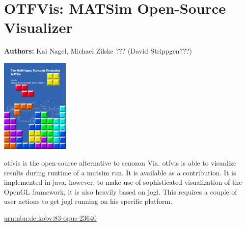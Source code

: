 \chapter{OTFVis: MATSim Open-Source Visualizer}
\label{ch:otfvis}

\hfill \textbf{Authors:} Kai Nagel, Michael Zilske ??? (David Strippgen???)

\begin{center} \includegraphics[width=0.25\textwidth, angle=0]{frontmatter/figures/MATSimBook} \end{center}


\gls{otfvis} is the open-source alternative to \gls{senozon} Via. 
\gls{otfvis} is able to visualize results during runtime of a \gls{matsim} run. 
It is available as a \gls{contribution}. 
It is implemented in \gls{java}, however, to make use of sophisticated visualization of the OpenGL framework, it is also heavily based on jogl. 
This requires a couple of user actions to get jogl running on his specific platform. 


\url{urn:nbn:de:kobv:83-opus-23640}





